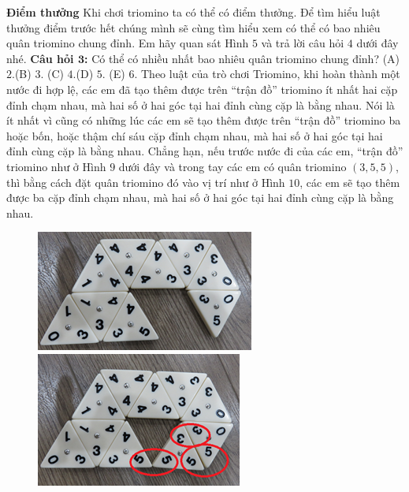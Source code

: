 \newpage
\graphicspath{ {../choicungbi/domino2/} }

	{\textbf{\color{toancuabi} {Điểm thưởng}}   
	\vskip 0.1cm
	Khi chơi triomino ta có thể có điểm thưởng.  Để tìm hiểu luật thưởng điểm trước hết chúng mình sẽ  cùng tìm hiểu xem có thể có bao nhiêu quân triomino chung đỉnh. Em hãy quan sát Hình $5$ và trả lời câu hỏi $4$ dưới  đây nhé.
	\vskip 0.1cm
	\textbf{\color{toancuabi}Câu hỏi $\pmb{3}$:}
	\vskip 0.1cm
	Có thể có nhiều nhất bao nhiêu quân triomino chung đỉnh?
	\vskip 0.1cm
	\hspace*{0pt}(A)  $2.$\hspace*{35pt}(B)  $3.$
	\hspace*{35pt}(C)  $4.$\hspace*{35pt}(D)  $5.$
	\hspace*{35pt}(E)  $6.$
	\vskip 0.1cm
	Theo luật của trò chơi Triomino, khi hoàn thành một nước đi hợp lệ, các em đã tạo thêm được trên “trận đồ” triomino ít nhất hai cặp đỉnh chạm nhau, mà hai số ở hai góc tại hai đỉnh cùng cặp là bằng nhau. Nói là ít nhất vì cũng có những lúc các em sẽ tạo thêm được trên “trận đồ” triomino ba hoặc bốn, hoặc thậm chí sáu cặp đỉnh chạm nhau, mà hai số ở hai góc tại hai đỉnh cùng cặp là bằng nhau. Chẳng hạn, nếu trước nước đi của các em, “trận đồ” triomino như ở Hình $9$ dưới đây và trong tay các em có quân triomino  $(3, 5, 5)$, thì bằng cách đặt quân triomino đó vào vị trí như ở Hình $10$, các em sẽ tạo thêm được ba cặp đỉnh chạm nhau, mà hai số ở hai góc tại hai đỉnh cùng cặp là bằng nhau.
	\begin{figure}[H]
		\centering
		\vspace*{-5pt}
		\captionsetup{labelformat=empty, justification=centering}
		\includegraphics[height=0.2\textwidth]{h7a}\quad
		\includegraphics[height=0.2\textwidth]{h8a}

\end{figure}}
